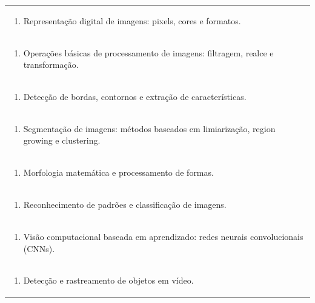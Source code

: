 \documentclass[11pt]{article}
\begin{document}
\begin{center}
\begin{longtable}{|p{4cm}|p{4cm}|p{4cm}|p{4cm}|}
\multicolumn{4}{|p{\dimexpr 16cm + 6\tabcolsep\relax}|}{\begin{enumerate}[start=2]\item Representação digital de imagens: pixels, cores e formatos.\end{enumerate}}\\
\multicolumn{4}{|p{\dimexpr 16cm + 6\tabcolsep\relax}|}{\begin{enumerate}[start=3]\item Operações básicas de processamento de imagens: filtragem, realce e transformação.\end{enumerate}}\\
\multicolumn{4}{|p{\dimexpr 16cm + 6\tabcolsep\relax}|}{\begin{enumerate}[start=4]\item Detecção de bordas, contornos e extração de características.\end{enumerate}}\\
\multicolumn{4}{|p{\dimexpr 16cm + 6\tabcolsep\relax}|}{\begin{enumerate}[start=5]\item Segmentação de imagens: métodos baseados em limiarização, region growing e clustering.\end{enumerate}}\\
\multicolumn{4}{|p{\dimexpr 16cm + 6\tabcolsep\relax}|}{\begin{enumerate}[start=6]\item Morfologia matemática e processamento de formas.\end{enumerate}}\\
\multicolumn{4}{|p{\dimexpr 16cm + 6\tabcolsep\relax}|}{\begin{enumerate}[start=7]\item Reconhecimento de padrões e classificação de imagens.\end{enumerate}}\\
\multicolumn{4}{|p{\dimexpr 16cm + 6\tabcolsep\relax}|}{\begin{enumerate}[start=8]\item Visão computacional baseada em aprendizado: redes neurais convolucionais (CNNs).\end{enumerate}}\\
\multicolumn{4}{|p{\dimexpr 16cm + 6\tabcolsep\relax}|}{\begin{enumerate}[start=9]\item Detecção e rastreamento de objetos em vídeo.\end{enumerate}}\\

\end{longtable}
\end{center}
\end{document}
